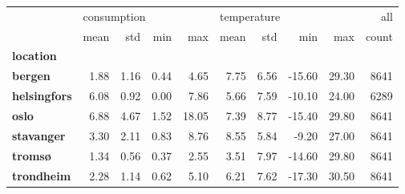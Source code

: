 \begin{tabular}{lrrrrrrrrr}
\toprule
{} & \multicolumn{4}{l}{consumption} & \multicolumn{4}{l}{temperature} &   all \\
{} &        mean &  std &  min &   max &        mean &  std &    min &   max & count \\
\textbf{location   } &             &      &      &       &             &      &        &       &       \\
\midrule
\textbf{bergen     } &        1.88 & 1.16 & 0.44 &  4.65 &        7.75 & 6.56 & -15.60 & 29.30 &  8641 \\
\textbf{helsingfors} &        6.08 & 0.92 & 0.00 &  7.86 &        5.66 & 7.59 & -10.10 & 24.00 &  6289 \\
\textbf{oslo       } &        6.88 & 4.67 & 1.52 & 18.05 &        7.39 & 8.77 & -15.40 & 29.80 &  8641 \\
\textbf{stavanger  } &        3.30 & 2.11 & 0.83 &  8.76 &        8.55 & 5.84 &  -9.20 & 27.00 &  8641 \\
\textbf{tromsø     } &        1.34 & 0.56 & 0.37 &  2.55 &        3.51 & 7.97 & -14.60 & 29.80 &  8641 \\
\textbf{trondheim  } &        2.28 & 1.14 & 0.62 &  5.10 &        6.21 & 7.62 & -17.30 & 30.50 &  8641 \\
\bottomrule
\end{tabular}
